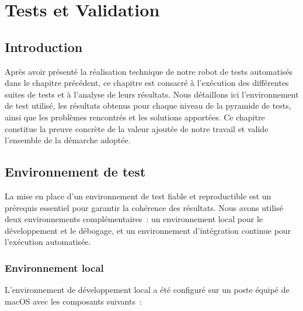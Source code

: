 
\chapter{Tests et Validation}
\label{chap:tests-validation}

\vspace{0.5cm}

\section*{Introduction}

Apr\`{e}s avoir pr\'{e}sent\'{e} la r\'{e}alisation technique de notre robot de tests
automatis\'{e}s dans le chapitre pr\'{e}c\'{e}dent, ce chapitre est consacr\'{e} \`{a}
l'ex\'{e}cution des diff\'{e}rentes suites de tests et \`{a} l'analyse de leurs
r\'{e}sultats. Nous d\'{e}taillons ici l'environnement de test utilis\'{e}, les
r\'{e}sultats obtenus pour chaque niveau de la pyramide de tests, ainsi que
les probl\`{e}mes rencontr\'{e}s et les solutions apport\'{e}es. Ce chapitre
constitue la preuve concr\`{e}te de la valeur ajout\'{e}e de notre travail et
valide l'ensemble de la d\'{e}marche adopt\'{e}e.

\section{Environnement de test}
\label{sec:env-test}

La mise en place d'un environnement de test fiable et reproductible est
un pr\'{e}requis essentiel pour garantir la coh\'{e}rence des r\'{e}sultats. Nous
avons utilis\'{e} deux environnements compl\'{e}mentaires~: un environnement
local pour le d\'{e}veloppement et le d\'{e}bogage, et un environnement
d'int\'{e}gration continue pour l'ex\'{e}cution automatis\'{e}e.

\subsection{Environnement local}

L'environnement de d\'{e}veloppement local a \'{e}t\'{e} configur\'{e} sur un poste
\'{e}quip\'{e} de macOS avec les composants suivants~:

